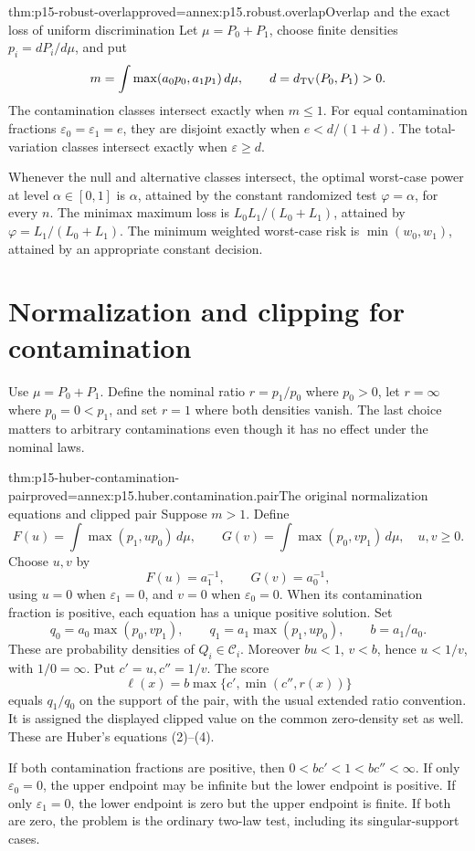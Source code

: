 \begin{hbtheorem}{thm:p15-robust-overlap}{proved=annex:p15.robust.overlap}{Overlap and the exact loss of uniform discrimination}
Let \(\mu=P_0+P_1\), choose finite densities \(p_i=dP_i/d\mu\), and put
\[
 m=\int\max(a_0p_0,a_1p_1)\,d\mu,\qquad d=d_{\rm TV}(P_0,P_1)>0.
\]
The contamination classes intersect exactly when \(m\leq1\).
For equal contamination fractions \(\varepsilon_0=\varepsilon_1=e\),
they are disjoint exactly when \(e<d/(1+d)\).
The total-variation classes intersect exactly when \(\varepsilon\geq d\).

Whenever the null and alternative classes intersect, the optimal
worst-case power at level \(\alpha\in[0,1]\) is \(\alpha\), attained
by the constant randomized test \(\varphi=\alpha\), for every \(n\).
The minimax maximum loss is \(L_0L_1/(L_0+L_1)\), attained by
\(\varphi=L_1/(L_0+L_1)\). The minimum weighted worst-case risk is
\(\min(w_0,w_1)\), attained by an appropriate constant decision.
\end{hbtheorem}

\section{Normalization and clipping for contamination}
\label{sec:p15-contamination-clipping}

Use \(\mu=P_0+P_1\). Define the nominal ratio \(r=p_1/p_0\) where
\(p_0>0\), let \(r=\infty\) where \(p_0=0<p_1\), and set \(r=1\)
where both densities vanish. The last choice matters to arbitrary
contaminations even though it has no effect under the nominal laws.

\begin{hbtheorem}{thm:p15-huber-contamination-pair}{proved=annex:p15.huber.contamination.pair}{The original normalization equations and clipped pair}
Suppose \(m>1\). Define
\[
 F(u)=\int\max(p_1,up_0)\,d\mu,\qquad
 G(v)=\int\max(p_0,vp_1)\,d\mu,\quad u,v\geq0.
\]
Choose \(u,v\) by
\[
 F(u)=a_1^{-1},\qquad G(v)=a_0^{-1},
\]
using \(u=0\) when \(\varepsilon_1=0\), and \(v=0\) when
\(\varepsilon_0=0\). When its contamination fraction is positive,
each equation has a unique positive solution.
Set
\[
 q_0=a_0\max(p_0,vp_1),\qquad
 q_1=a_1\max(p_1,up_0),\qquad b=a_1/a_0.
\]
These are probability densities of \(Q_i\in\mathcal C_i\).
Moreover \(bu<1\), \(v<b\), hence \(u<1/v\), with \(1/0=\infty\).
Put \(c'=u,c''=1/v\). The score
\[
 \ell(x)=b\max\{c',\min(c'',r(x))\}
\]
equals \(q_1/q_0\) on the support of the pair, with the usual extended
ratio convention. It is assigned the displayed clipped value on the
common zero-density set as well.
These are Huber's equations (2)--(4).

If both contamination fractions are positive, then
\(0<bc'<1<bc''<\infty\). If only \(\varepsilon_0=0\), the upper endpoint
may be infinite but the lower endpoint is positive.
If only \(\varepsilon_1=0\), the lower endpoint is zero but the upper
endpoint is finite. If both are zero, the problem is the ordinary
two-law test, including its singular-support cases.
\end{hbtheorem}

